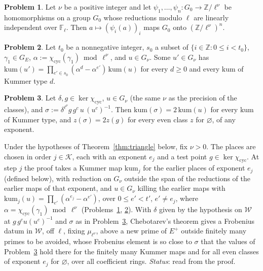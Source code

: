 \documentclass[reqno]{amsart}
\theoremstyle{definition}
\newtheorem{problem}{Problem}[section]
\theoremstyle{plain}
\newcommand{\Z}{\mathbb{Z}}
\newcommand{\Kc}{\mathcal{K}}
\newcommand{\cyc}{\chi_{\mathrm{cyc}}}
\begin{document}
\begin{problem}\label{pr:surjective}
Let \(\nu\) be a positive integer and let \(\psi_1, \dots, \psi_n \colon G_0 \to \Z/\ell^\nu\) be homomorphisms on a group \(G_0\) whose reductions modulo \(\ell\) are linearly independent over \(\mathbb F_\ell\).  Then \(a \mapsto (\psi_i(a))_i\) maps \(G_0\) onto \((\Z/\ell^\nu)^n\).
\end{problem}

\begin{problem}\label{pr:separate}
Let \(t_0\) be a nonnegative integer, \(s_0\) a subset of \(\{i\in\Z:0\le i<t_0\}\), \(\gamma_1 \in G_E\), \(\alpha := \cyc(\gamma_1) \bmod \ell^\nu\), and \(u \in G_\nu\).  Some \(u' \in G_\nu\) has \(\mathrm{kum}(u') = \prod_{e' \in s_0}(\alpha^d - \alpha^{e'})\,\mathrm{kum}(u)\) for every \(d \ge 0\) and every \(\mathrm{kum}\) of Kummer type \(d\).
\end{problem}

\begin{problem}\label{pr:two-values}
Let \(\delta, g \in \ker\cyc\), \(u \in G_\nu\) (the same \(\nu\) as the precision of the classes), and \(\sigma := \delta^{\ell^\nu} g\,g^c\,u\,(u^c)^{-1}\).  Then \(\mathrm{kum}(\sigma) = 2\,\mathrm{kum}(u)\) for every \(\mathrm{kum}\) of Kummer type, and \(z(\sigma) = 2z(g)\) for every even class \(z\) for \(\varnothing\), of any exponent.
\end{problem}

Under the hypotheses of Theorem~\ref{thm:triangle} below, fix \(\nu > 0\).  The places are chosen in order \(j \in \Kc\), each with an exponent \(e_j\) and a test point \(g \in \ker\cyc\).  At step \(j\) the proof takes a Kummer map \(\mathrm{kum}_j\) for the earlier places of exponent \(e_j\) (defined below), with reduction on \(G_\nu\) outside the span of the reductions of the earlier maps of that exponent, and \(u \in G_\nu\) killing the earlier maps with \(\mathrm{kum}_j(u) = \prod_{e'}(\alpha^{e_j} - \alpha^{e'})\), over \(0 \le e' < t'\), \(e' \ne e_j\), where \(\alpha = \cyc(\gamma_1) \bmod \ell^\nu\) (Problems~\ref{pr:surjective}, \ref{pr:separate}).  With \(\delta\) given by the hypothesis on \(\mathcal W\) at \(g\,g^c u(u^c)^{-1}\) and \(\sigma\) as in Problem~\ref{pr:two-values}, Chebotarev's theorem \cite[VII (13.4)]{Ne} gives a Frobenius datum in \(\mathcal W\), off \(\ell\), fixing \(\mu_{\ell^\nu}\), above a new prime of \(E^+\) outside finitely many primes to be avoided, whose Frobenius element is so close to \(\sigma\) that the values of Problem~\ref{pr:two-values} hold there for the finitely many Kummer maps and for all even classes of exponent \(e_j\) for \(\varnothing\), over all coefficient rings.  \emph{Status}: read from the proof.
\end{document}
